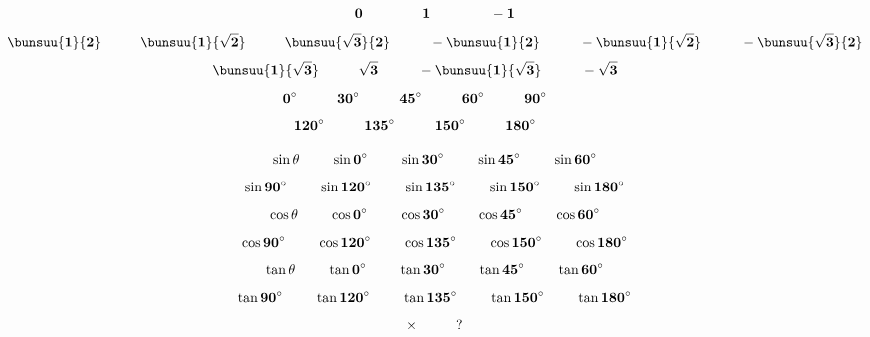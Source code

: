 \documentclass[a4paper]{jsarticle}
\begin{document}
\Huge
\[\bf 
 0 \hspace{15mm}
 1 \hspace{15mm}
 -1
 \]
\[\bf
  \bunsuu{\bf 1}{\bf 2} \hspace{10mm}
 \bunsuu{\bf 1}{\sqrt{\bf 2}} \hspace{10mm}
 \bunsuu{\sqrt{\bf 3}}{\bf 2} \hspace{10mm}
 -\bunsuu{\bf 1}{\bf 2} \hspace{10mm}
 -\bunsuu{\bf 1}{\sqrt{\bf 2}} \hspace{10mm}
 -\bunsuu{\sqrt{\bf 3}}{\bf 2} 
\]
\[\bf{
 \bunsuu{\bf 1}{\sqrt{\bf 3}} \hspace{10mm}
 \sqrt{3}  \hspace{10mm}
 -\bunsuu{\bf 1}{\sqrt{\bf 3}} \hspace{10mm}
 -\sqrt{3}  \hspace{10mm}
}\]
\[\bf
 0^\circ \hspace{10mm}
 30^\circ \hspace{10mm}
 45^\circ \hspace{10mm}
 60^\circ  \hspace{10mm}
 90^\circ \hspace{10mm}
\]
\[\bf
 120^\circ \hspace{10mm}
 135^\circ  \hspace{10mm}
 150^\circ \hspace{10mm}
 180^\circ \hspace{10mm}
\]

\[\bf
 \sin \theta \hspace{8mm}
 \sin 0^\circ \hspace{8mm}
 \sin 30^\circ \hspace{8mm}
 \sin 45^\circ \hspace{8mm}
 \sin 60^\circ 
\]
\[\bf
 \sin 90^\circ \hspace{8mm}
 \sin 120^\circ \hspace{8mm}
 \sin 135^\circ \hspace{8mm}
 \sin 150^\circ \hspace{8mm}
 \sin 180^\circ 
\]
\[\bf
 \cos \theta \hspace{8mm}
 \cos 0^\circ \hspace{8mm}
 \cos 30^\circ \hspace{8mm}
 \cos 45^\circ \hspace{8mm}
 \cos 60^\circ 
\]
\[\bf
 \cos 90^\circ \hspace{8mm}
 \cos 120^\circ \hspace{8mm}
 \cos 135^\circ \hspace{8mm}
 \cos 150^\circ \hspace{8mm}
 \cos 180^\circ 
\]
\[\bf
 \tan \theta \hspace{8mm}
 \tan 0^\circ \hspace{8mm}
 \tan 30^\circ \hspace{8mm}
 \tan 45^\circ \hspace{8mm}
 \tan 60^\circ 
\]
\[\bf
 \tan 90^\circ \hspace{8mm}
 \tan 120^\circ \hspace{8mm}
 \tan 135^\circ \hspace{8mm}
 \tan 150^\circ \hspace{8mm}
 \tan 180^\circ 
\]
\[\bf
 \times \hspace{10mm}
 ?
\]
\end{document}
